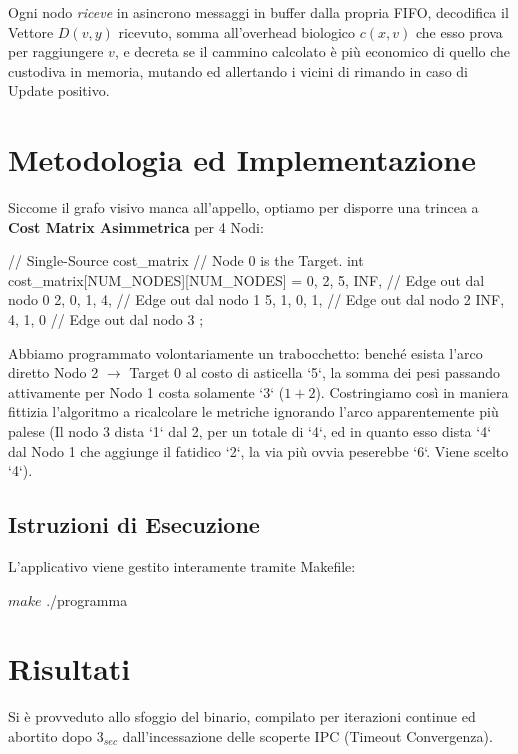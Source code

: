 \documentclass[a4paper,12pt]{article}
\begin{document}
Ogni nodo \textit{riceve} in asincrono messaggi in buffer dalla propria FIFO, decodifica il Vettore $D(v,y)$ ricevuto, somma all'overhead biologico $c(x,v)$ che esso prova per raggiungere $v$, e decreta se il cammino calcolato è più economico di quello che custodiva in memoria, mutando ed allertando i vicini di rimando in caso di Update positivo.

\section{Metodologia ed Implementazione}

Siccome il grafo visivo manca all'appello, optiamo per disporre una trincea a \textbf{Cost Matrix Asimmetrica} per 4 Nodi:
\begin{ccode}
// Single-Source cost_matrix
// Node 0 is the Target.
int cost_matrix[NUM_NODES][NUM_NODES] = {
    {0, 2, 5, INF}, // Edge out dal nodo 0
    {2, 0, 1, 4},   // Edge out dal nodo 1
    {5, 1, 0, 1},   // Edge out dal nodo 2
    {INF, 4, 1, 0}  // Edge out dal nodo 3
};
\end{ccode}
Abbiamo programmato volontariamente un trabocchetto: benché esista l'arco diretto Nodo 2 $\rightarrow$ Target 0 al costo di asticella `5`, la somma dei pesi passando attivamente per Nodo 1 costa solamente `3` ($1+2$). Costringiamo così in maniera fittizia l'algoritmo a ricalcolare le metriche ignorando l'arco apparentemente più palese (Il nodo 3 dista `1` dal 2, per un totale di `4`, ed in quanto esso dista `4` dal Nodo 1 che aggiunge il fatidico `2`, la via più ovvia peserebbe `6`. Viene scelto `4`).


\subsection{Istruzioni di Esecuzione}
L'applicativo viene gestito interamente tramite Makefile:
\begin{terminal}
$ make
$ ./programma
\end{terminal}

\section{Risultati}
Si è provveduto allo sfoggio del binario, compilato per iterazioni continue ed abortito dopo $3_{sec}$ dall'incessazione delle scoperte IPC (Timeout Convergenza).
\end{document}

